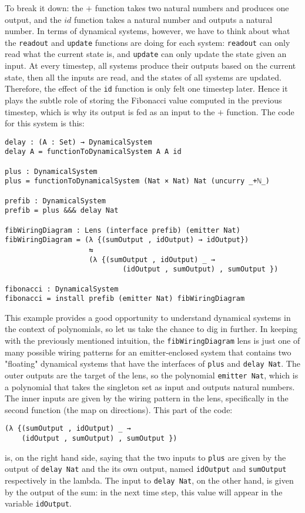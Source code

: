 To break it down: the $+$ function takes two natural numbers and produces one output, and the $id$ function takes a natural number and outputs a natural number. In terms of dynamical systems, however, we have to think about what the \texttt{readout} and \texttt{update} functions are doing for each system: \texttt{readout} can only read what the current state is, and \texttt{update} can only update the state given an input. At every timestep, all systems produce their outputs based on the current state, then all the inputs are read, and the states of all systems are updated. Therefore, the effect of the \texttt{id} function is only felt one timestep later. Hence it plays the subtle role of storing the Fibonacci value computed in the previous timestep, which is why its output is fed as an input to the $+$ function. The code for this system is this:

\begin{verbatim}
delay : (A : Set) → DynamicalSystem
delay A = functionToDynamicalSystem A A id

plus : DynamicalSystem
plus = functionToDynamicalSystem (Nat × Nat) Nat (uncurry _+ℕ_)

prefib : DynamicalSystem
prefib = plus &&& delay Nat

fibWiringDiagram : Lens (interface prefib) (emitter Nat)
fibWiringDiagram = (λ {(sumOutput , idOutput) → idOutput})
                    ⇆ 
                    (λ {(sumOutput , idOutput) _ → 
                            (idOutput , sumOutput) , sumOutput })

fibonacci : DynamicalSystem
fibonacci = install prefib (emitter Nat) fibWiringDiagram
\end{verbatim}

This example provides a good opportunity to understand dynamical systems in the context of polynomials, so let us take the chance to dig in further. In keeping with the previously mentioned intuition, the \texttt{fibWiringDiagram} lens is just one of many possible wiring patterns for an emitter-enclosed system that contains two "floating" dynamical systems that have the interfaces of \texttt{plus} and \texttt{delay Nat}. The outer outputs are the target of the lens, so the polynomial \texttt{emitter Nat}, which is a polynomial that takes the singleton set as input and outputs natural numbers. The inner inputs are given by the wiring pattern in the lens, specifically in the second function (the map on directions). This part of the code:
\begin{verbatim}
(λ {(sumOutput , idOutput) _ → 
    (idOutput , sumOutput) , sumOutput })
\end{verbatim}
is, on the right hand side, saying that the two inputs to \texttt{plus} are given by the output of \texttt{delay Nat} and the its own output, named \texttt{idOutput} and \texttt{sumOutput} respectively in the lambda. The input to \texttt{delay Nat}, on the other hand, is given by the output of the sum: in the next time step, this value will appear in the variable \texttt{idOutput}.


